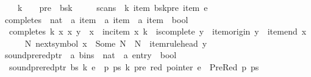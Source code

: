 \begin{isabellebody}
\ \ \ \ k\ {\isachargreater}{\kern0pt}\ {}\ {\isasymand}\ pre\ {\isacharless}{\kern0pt}\ {\isacharbar}{\kern0pt}bs{\isacharbang}{\kern0pt}{\isacharparenleft}{\kern0pt}k{\isacharminus}{\kern0pt}{}{\isacharparenright}{\kern0pt}{\isacharbar}{\kern0pt}\ {\isasymand}\isanewline
\ \ \ \ scans\ {\isasymomega}\ k\ {\isacharparenleft}{\kern0pt}item\ {\isacharparenleft}{\kern0pt}bs{\isacharbang}{\kern0pt}{\isacharparenleft}{\kern0pt}k{\isacharminus}{\kern0pt}{}{\isacharparenright}{\kern0pt}{\isacharbang}{\kern0pt}pre{\isacharparenright}{\kern0pt}{\isacharparenright}{\kern0pt}\ {\isacharparenleft}{\kern0pt}item\ e{\isacharparenright}{\kern0pt}{\isachardoublequoteclose}\isanewline
\isanewline
{}\isamarkupfalse%
\ completes\ {\isacharcolon}{\kern0pt}{\isacharcolon}{\kern0pt}\ {\isachardoublequoteopen}nat\ {\isasymRightarrow}\ {\isacharprime}{\kern0pt}a\ item\ {\isasymRightarrow}\ {\isacharprime}{\kern0pt}a\ item\ {\isasymRightarrow}\ {\isacharprime}{\kern0pt}a\ item\ {\isasymRightarrow}\ bool{\isachardoublequoteclose}\ \isanewline
\ \ {\isachardoublequoteopen}completes\ k\ x{\isacharprime}{\kern0pt}\ x\ y\ {\isasymequiv}\ x\ {\isacharequal}{\kern0pt}\ inc{\isacharunderscore}{\kern0pt}item\ x{\isacharprime}{\kern0pt}\ k\ {\isasymand}\ is{\isacharunderscore}{\kern0pt}complete\ y\ {\isasymand}\ item{\isacharunderscore}{\kern0pt}origin\ y\ {\isacharequal}{\kern0pt}\ item{\isacharunderscore}{\kern0pt}end\ x{\isacharprime}{\kern0pt}\ {\isasymand}\isanewline
\ \ \ \ {\isacharparenleft}{\kern0pt}{\isasymexists}N{\isachardot}{\kern0pt}\ next{\isacharunderscore}{\kern0pt}symbol\ x{\isacharprime}{\kern0pt}\ {\isacharequal}{\kern0pt}\ Some\ N\ {\isasymand}\ N\ {\isacharequal}{\kern0pt}\ item{\isacharunderscore}{\kern0pt}rule{\isacharunderscore}{\kern0pt}head\ y{\isacharparenright}{\kern0pt}{\isachardoublequoteclose}\isanewline
\isanewline
{}\isamarkupfalse%
\ sound{\isacharunderscore}{\kern0pt}prered{\isacharunderscore}{\kern0pt}ptr\ {\isacharcolon}{\kern0pt}{\isacharcolon}{\kern0pt}\ {\isachardoublequoteopen}{\isacharprime}{\kern0pt}a\ bins\ {\isasymRightarrow}\ nat\ {\isasymRightarrow}\ {\isacharprime}{\kern0pt}a\ entry\ {\isasymRightarrow}\ bool{\isachardoublequoteclose}\ \isanewline
\ \ {\isachardoublequoteopen}sound{\isacharunderscore}{\kern0pt}prered{\isacharunderscore}{\kern0pt}ptr\ bs\ k\ e\ {\isasymequiv}\ {\isasymforall}p\ ps\ k{\isacharprime}{\kern0pt}\ pre\ red{\isachardot}{\kern0pt}\ pointer\ e\ {\isacharequal}{\kern0pt}\ PreRed\ p\ ps\ {\isasymand}\isanewline

\end{isabellebody}
